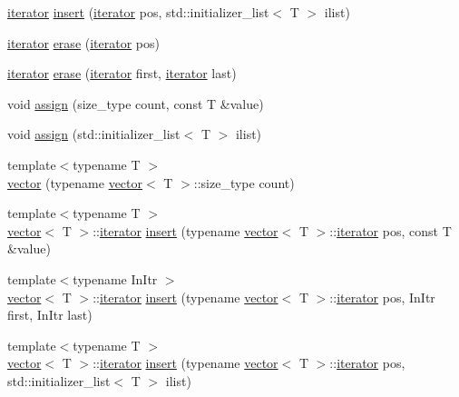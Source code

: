 \begin{DoxyCompactItemize}
\item 
\mbox{\hyperlink{classsc_1_1vector_1_1iterator}{iterator}} \mbox{\hyperlink{classsc_1_1vector_a012eb735dde72dfb787dca4acea6c642}{insert}} (\mbox{\hyperlink{classsc_1_1vector_1_1iterator}{iterator}} pos, std\+::initializer\+\_\+list$<$ T $>$ ilist)
\item 
\mbox{\hyperlink{classsc_1_1vector_1_1iterator}{iterator}} \mbox{\hyperlink{classsc_1_1vector_a09f7a21d470c64b5029839d39e2f6c06}{erase}} (\mbox{\hyperlink{classsc_1_1vector_1_1iterator}{iterator}} pos)
\item 
\mbox{\hyperlink{classsc_1_1vector_1_1iterator}{iterator}} \mbox{\hyperlink{classsc_1_1vector_a1371718053d10dbd4c2c699b1de5108d}{erase}} (\mbox{\hyperlink{classsc_1_1vector_1_1iterator}{iterator}} first, \mbox{\hyperlink{classsc_1_1vector_1_1iterator}{iterator}} last)
\item 
void \mbox{\hyperlink{classsc_1_1vector_af5f4df8bef0f4ebd20bb4c5aab212d97}{assign}} (size\+\_\+type count, const T \&value)
\item 
void \mbox{\hyperlink{classsc_1_1vector_a0cdd83f25897cf689a6805f94df13b2f}{assign}} (std\+::initializer\+\_\+list$<$ T $>$ ilist)
\item 
{\footnotesize template$<$typename T $>$ }\\\mbox{\hyperlink{classsc_1_1vector_a09edcd127164af330873721038aa4ccc}{vector}} (typename \mbox{\hyperlink{classsc_1_1vector}{vector}}$<$ T $>$\+::size\+\_\+type count)
\item 
{\footnotesize template$<$typename T $>$ }\\\mbox{\hyperlink{classsc_1_1vector}{vector}}$<$ T $>$\+::\mbox{\hyperlink{classsc_1_1vector_1_1iterator}{iterator}} \mbox{\hyperlink{classsc_1_1vector_a1aaf0a1fcdac2a58a96a2a00105b2e1f}{insert}} (typename \mbox{\hyperlink{classsc_1_1vector}{vector}}$<$ T $>$\+::\mbox{\hyperlink{classsc_1_1vector_1_1iterator}{iterator}} pos, const T \&value)
\item 
{\footnotesize template$<$typename In\+Itr $>$ }\\\mbox{\hyperlink{classsc_1_1vector}{vector}}$<$ T $>$\+::\mbox{\hyperlink{classsc_1_1vector_1_1iterator}{iterator}} \mbox{\hyperlink{classsc_1_1vector_a774a81ea7131584862592c29a8137e28}{insert}} (typename \mbox{\hyperlink{classsc_1_1vector}{vector}}$<$ T $>$\+::\mbox{\hyperlink{classsc_1_1vector_1_1iterator}{iterator}} pos, In\+Itr first, In\+Itr last)
\item 
{\footnotesize template$<$typename T $>$ }\\\mbox{\hyperlink{classsc_1_1vector}{vector}}$<$ T $>$\+::\mbox{\hyperlink{classsc_1_1vector_1_1iterator}{iterator}} \mbox{\hyperlink{classsc_1_1vector_a4e59b7f5bc99a5436397426626719251}{insert}} (typename \mbox{\hyperlink{classsc_1_1vector}{vector}}$<$ T $>$\+::\mbox{\hyperlink{classsc_1_1vector_1_1iterator}{iterator}} pos, std\+::initializer\+\_\+list$<$ T $>$ ilist)

\end{DoxyCompactItemize}
